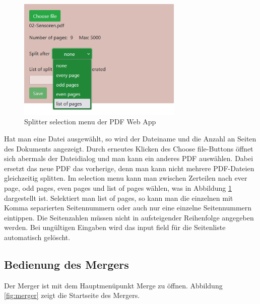 \begin{figure}[!htbp]
	\centering
	\includegraphics[width=0.7\textwidth]{"images/splitter2.png"}
	\caption{Splitter selection menu der PDF Web App}
	\label{fig:splitter2}
\end{figure}

Hat man eine Datei ausgewählt, so wird der Dateiname und die Anzahl an Seiten des Dokuments angezeigt. Durch erneutes Klicken des Choose file-Buttons öffnet sich abermals der Dateidialog und man kann ein anderes PDF auswählen. Dabei ersetzt das neue PDF das vorherige, denn man kann nicht mehrere PDF-Dateien gleichzeitig splitten. Im selection menu kann man zwischen Zerteilen nach ever page, odd pages, even pages und list of pages wählen, was in Abbildung \ref{fig:splitter2} dargestellt ist. Selektiert man list of pages, so kann man die einzelnen mit Komma separierten Seitennummern oder auch nur eine einzelne Seitennummern eintippen. Die Seitenzahlen müssen nicht in aufsteigender Reihenfolge angegeben werden. Bei ungültigen Eingaben wird das input field für die Seitenliste automatisch gelöscht. 

\subsection{Bedienung des Mergers}
Der Merger ist mit dem Hauptmenüpunkt Merge zu öffnen. Abbildung \ref{fig:merger} zeigt die Startseite des Mergers. 

